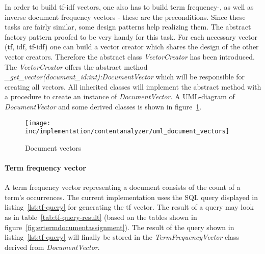 In order to build tf-idf vectors, one also has to build term frequency-, as well as inverse document frequency vectors - these are the preconditions.
Since these tasks are fairly similar, some design patterns help realizing them.
The \gls{abstract factory} pattern proofed to be very handy for this task.
For each necessary vector (tf, idf, tf-idf) one can build a vector creator which shares the design of the other vector creators.
Therefore the abstract class \textit{VectorCreator} has been introduced.
The \textit{VectorCreator} offers the abstract method \textit{\_get\_vector(document\_id:int):DocumentVector} which will be responsible for creating all vectors.
All inherited classes will implement the abstract method with a procedure to create an instance of \textit{DocumentVector}.
A UML-diagram of \textit{DocumentVector} and some derived classes is shown in figure~\ref{fig:uml-document-vectors}.

\begin{figure}[h]
    \center
    \texttt{[image: inc/implementation/contentanalyzer/uml\_document\_vectors]}
    \caption{Document vectors}
    \label{fig:uml-document-vectors}
\end{figure}

\FloatBarrier

\paragraph{Term frequency vector}
A term frequency vector representing a document consists of the count of a term's occurrences.
The current implementation uses the SQL query displayed in listing~\ref{lst:tf-query} for generating the tf vector.
The result of a query may look as in table~\ref{tab:tf-query-result} (based on the tables shown in figure~\ref{fig:ertermdocumentassignment}).
The result of the query shown in listing~\ref{lst:tf-query} will finally be stored in the \textit{TermFrequencyVector} class derived from \textit{DocumentVector}.


